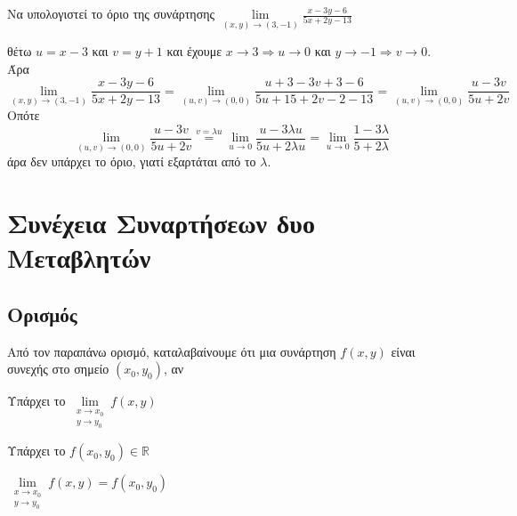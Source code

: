 \begin{example}
  Να υπολογιστεί το όριο της συνάρτησης 
  $ \lim\limits_{(x,y)\to (3, -1)} \frac{x-3y-6}{5x+2y-13} $ 
  \begin{solution}
    θέτω $ u=x-3 $ και $ v=y+1 $ και έχουμε $ x \to 3 \Rightarrow u \to 0 $ και 
    $ y \to -1 \Rightarrow v \to 0 $. Άρα
    \[
      \lim\limits_{(x,y)\to (3, -1)} \frac{x-3y-6}{5x+2y-13} = \lim_{(u,v) \to (0,0)} 
      \frac{u+3-3v+3-6}{5u+15+2v-2-13} = \lim_{(u,v) \to (0,0)} \frac{u-3v}{5u+2v}
    \] 
    Οπότε
    \[
      \lim_{(u,v) \to (0,0)} \frac{u-3v}{5u+2v} \overset{v= \lambda u}{=} 
      \lim_{u \to 0} \frac{u- 3 \lambda u}{5u + 2 \lambda u} = \lim_{u \to 0}
      \frac{1 - 3 \lambda}{5 + 2 \lambda}
    \]
    άρα δεν υπάρχει το όριο, γιατί εξαρτάται από το $ \lambda $.
  \end{solution}
\end{example}



\chapter{Συνέχεια Συναρτήσεων δυο Μεταβλητών}

\section{Ορισμός}



\begin{rem}
  Από τον παραπάνω ορισμό, καταλαβαίνουμε ότι μια συνάρτηση $ f(x,y) $ 
  είναι συνεχής στο σημείο $ (x_{0}, y_{0}) $, αν
  \begin{myitemize}
    \item Υπάρχει το $ \lim\limits_{\substack{x\to x_{0} \\y \to y_{0}}} f(x,y) $
    \item Υπάρχει το $ f(x_{0}, y_{0}) \in \mathbb{R} $
    \item $  \lim\limits_{\substack{x\to x_{0} \\ y \to y_{0}}} f(x,y) = 
      f(x_{0}, y_{0}) $
  \end{myitemize}
\end{rem}

